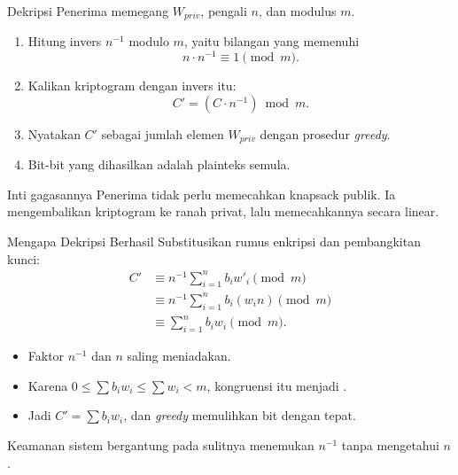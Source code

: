 \documentclass[aspectratio=169,11pt]{beamer}
\begin{document}
\begin{frame}{Dekripsi}
    Penerima memegang $W_{priv}$, pengali $n$, dan modulus $m$.
    \begin{enumerate}
        \item Hitung invers $n^{-1}$ modulo $m$, yaitu bilangan yang memenuhi
              \[
                  n \cdot n^{-1} \equiv 1 \pmod{m}.
              \]
        \item Kalikan kriptogram dengan invers itu:
              \[
                  C' = (C \cdot n^{-1}) \bmod m.
              \]
        \item Nyatakan $C'$ sebagai jumlah elemen $W_{priv}$ dengan prosedur
              \textit{greedy}.
        \item Bit-bit yang dihasilkan adalah plainteks semula.
    \end{enumerate}
    \vspace{0.1cm}
    \begin{alertblock}{Inti gagasannya}
        \footnotesize
        Penerima tidak perlu memecahkan knapsack publik. Ia mengembalikan
        kriptogram ke ranah privat, lalu memecahkannya secara linear.
    \end{alertblock}
\end{frame}

\begin{frame}{Mengapa Dekripsi Berhasil}
    Substitusikan rumus enkripsi dan pembangkitan kunci:
    \begin{align*}
        C' &\equiv n^{-1}\sum_{i=1}^{n} b_i w'_i \pmod{m} \\
           &\equiv n^{-1}\sum_{i=1}^{n} b_i (w_i n) \pmod{m} \\
           &\equiv \sum_{i=1}^{n} b_i w_i \pmod{m}.
    \end{align*}
    \begin{itemize}
        \item Faktor $n^{-1}$ dan $n$ saling meniadakan.
        \item Karena $0 \le \sum b_iw_i \le \sum w_i < m$, kongruensi itu
              menjadi .
        \item Jadi $C' = \sum b_iw_i$, dan \textit{greedy} memulihkan bit
              dengan tepat.
    \end{itemize}
    \vspace{0.05cm}
    \footnotesize
    Keamanan sistem bergantung pada sulitnya menemukan $n^{-1}$ tanpa
    mengetahui $n$.
\end{frame}
\end{document}
